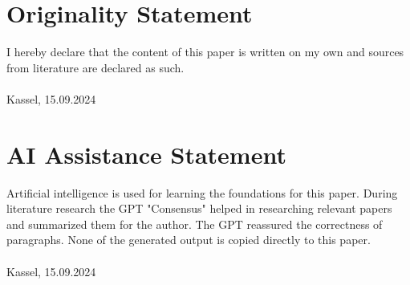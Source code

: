 \section{Originality Statement}
I hereby declare that the content of this paper is written on my own and sources from literature are declared as such.\vspace{2cm}\\
\underline{\hspace{10cm}}\\
\footnotesize Kassel, 15.09.2024 \normalsize
\section{AI Assistance Statement}
Artificial intelligence is used for learning the foundations for this paper. During literature research the GPT "Consensus" helped in researching relevant papers and summarized them for the author. The GPT reassured the correctness of paragraphs. None of the generated output is copied directly to this paper. \vspace{2cm}\\
\underline{\hspace{10cm}}\\
\footnotesize Kassel, 15.09.2024 \normalsize
